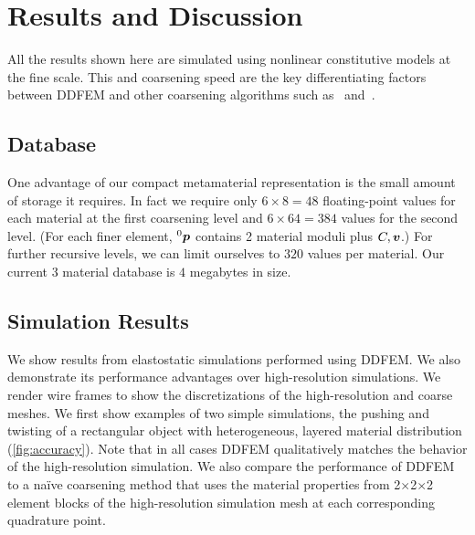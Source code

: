\section{Results and Discussion}
\label{sec:result}
All the results shown here are simulated using nonlinear constitutive models at the fine scale. This and coarsening speed are the key differentiating factors between DDFEM and other coarsening algorithms such as~\citet{Nesme2009} and~\citet{Kharevych2009}.

\subsection{Database}
One advantage of our compact metamaterial representation is the small amount of storage it requires. In fact we require only $6\times8=48$ floating-point values for each material at the first coarsening level and $6\times64=384$ values for the second level.
(For each finer element, $^0\mbox{$\bm{p}$}$ contains 2 material moduli plus $C, \mbox{$\bm{v}$}$.)
For further recursive levels, we can limit ourselves to $320$ values per material.
Our current 3 material database is $4$ megabytes in size.

\subsection{Simulation Results}
We show results from elastostatic simulations performed using DDFEM. We also demonstrate its performance advantages over high-resolution simulations. We render wire frames to show the discretizations of the high-resolution and coarse meshes. We first show examples of two simple simulations, the pushing and twisting of a rectangular object with heterogeneous, layered material distribution (\autoref{fig:accuracy}). Note that in all cases DDFEM qualitatively matches the behavior of the high-resolution simulation. We also compare the performance of DDFEM to a na\"{i}ve coarsening method that uses the material properties from 2$\times$2$\times$2 element blocks of the high-resolution simulation mesh at each corresponding quadrature point.  


